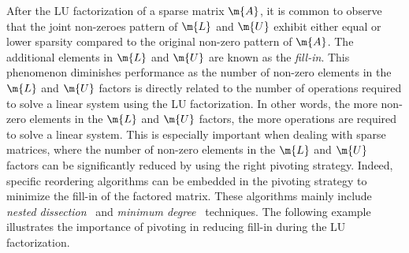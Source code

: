 After the \ac{LU} factorization of a sparse matrix $\m{A}$, it is common to observe that the joint non-zeroes pattern of $\m{L}$ and $\m{U}$ exhibit either equal or lower sparsity compared to the original non-zero pattern of $\m{A}$. The additional elements in $\m{L}$ and $\m{U}$ are known as the \emph{fill-in}. This phenomenon diminishes performance as the number of non-zero elements in the $\m{L}$ and $\m{U}$ factors is directly related to the number of operations required to solve a linear system using the \ac{LU} factorization. In other words, the more non-zero elements in the $\m{L}$ and $\m{U}$ factors, the more operations are required to solve a linear system. This is especially important when dealing with sparse matrices, where the number of non-zero elements in the $\m{L}$ and $\m{U}$ factors can be significantly reduced by using the right pivoting strategy. Indeed, specific reordering algorithms can be embedded in the pivoting strategy to minimize the fill-in of the factored matrix. These algorithms mainly include \emph{nested dissection}~\cite{george1973nested, lipton1979generalized} and \emph{minimum degree}~\cite{markowitz1957elimination, rose1970symmetric} techniques. The following example illustrates the importance of pivoting in reducing fill-in during the \ac{LU} factorization.

